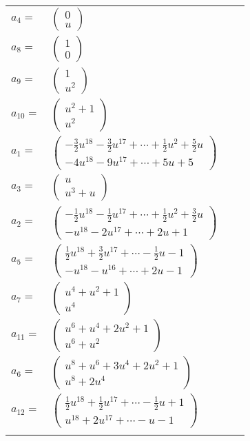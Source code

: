 \documentclass[1p]{elsarticle_modified}
\theoremstyle{definition}
\begin{document}
\begin{tabular}{m{7pt} m{180pt} m{7pt} m{180pt} }
\flushright $a_{4}=$&$\begin{pmatrix}0\\u\end{pmatrix}$ \\
\flushright $a_{8}=$&$\begin{pmatrix}1\\0\end{pmatrix}$ \\
\flushright $a_{9}=$&$\begin{pmatrix}1\\u^2\end{pmatrix}$ \\
\flushright $a_{10}=$&$\begin{pmatrix}u^2+1\\u^2\end{pmatrix}$ \\
\flushright $a_{1}=$&$\begin{pmatrix}-\frac{3}{2} u^{18}-\frac{3}{2} u^{17}+\cdots+\frac{1}{2} u^2+\frac{5}{2} u\\-4 u^{18}-9 u^{17}+\cdots+5 u+5\end{pmatrix}$ \\
\flushright $a_{3}=$&$\begin{pmatrix}u\\u^3+u\end{pmatrix}$ \\
\flushright $a_{2}=$&$\begin{pmatrix}-\frac{1}{2} u^{18}-\frac{1}{2} u^{17}+\cdots+\frac{1}{2} u^2+\frac{3}{2} u\\- u^{18}-2 u^{17}+\cdots+2 u+1\end{pmatrix}$ \\
\flushright $a_{5}=$&$\begin{pmatrix}\frac{1}{2} u^{18}+\frac{3}{2} u^{17}+\cdots-\frac{1}{2} u-1\\- u^{18}- u^{16}+\cdots+2 u-1\end{pmatrix}$ \\
\flushright $a_{7}=$&$\begin{pmatrix}u^4+u^2+1\\u^4\end{pmatrix}$ \\
\flushright $a_{11}=$&$\begin{pmatrix}u^6+u^4+2 u^2+1\\u^6+u^2\end{pmatrix}$ \\
\flushright $a_{6}=$&$\begin{pmatrix}u^8+u^6+3 u^4+2 u^2+1\\u^8+2 u^4\end{pmatrix}$ \\
\flushright $a_{12}=$&$\begin{pmatrix}\frac{1}{2} u^{18}+\frac{1}{2} u^{17}+\cdots-\frac{1}{2} u+1\\u^{18}+2 u^{17}+\cdots- u-1\end{pmatrix}$\\&\end{tabular}
\end{document}
